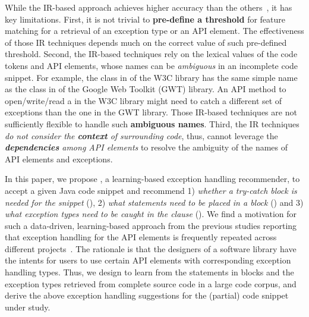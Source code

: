 While the IR-based approach achieves higher accuracy than the
others~\cite{xrank-fse20}, it has key limitations. First, it is
not trivial to {\bf pre-define a threshold} for feature matching for a
retrieval of an exception type or an API element. The effectiveness of
those IR techniques depends much on the correct value of such
pre-defined threshold. Second, the IR-based techniques rely on the
lexical values of the code tokens and API elements, whose names can be
{\em ambiguous} in an incomplete code snippet. For example, the
 class in  of the W3C library has
the same simple name as the  class in
 of the Google Web
Toolkit (GWT) library. An API method to open/write/read a
 in the W3C library might need to catch a different set
of exceptions than the one in the GWT library. Those IR-based
techniques are not sufficiently flexible to handle such {\bf ambiguous
  names}. Third, the IR techniques {\em do not consider the {\bf
    context} of surrounding code}, thus, cannot leverage the {\em {\bf
    dependencies} among API elements} to resolve the ambiguity of the
names of API elements and exceptions.

In this paper, we propose {\tool}, a learning-based exception handling
recommender, to accept a given Java code snippet and recommend 1) {\em
  whether a try-catch block is needed for the snippet} ({\xblock}), 2)
{\em what statements need to be placed in a  block}
({\xstate}) and 3) {\em what exception types need to be caught in the
   clause} ({\xtype}).  We find a motivation for such a
data-driven, learning-based approach from the previous studies
reporting that exception handling for the API elements is frequently
repeated across different
projects~\cite{chanchal-scam14,zhong-jss18}. The rationale is that the
designers of a software library have the intents for users to use
certain API elements with corresponding exception handling types.
Thus, we design {\tool} to learn from the statements in
 blocks and the exception types retrieved from complete
source code in a large code corpus, and derive the above exception handling
suggestions
for the (partial) code snippet under study.



